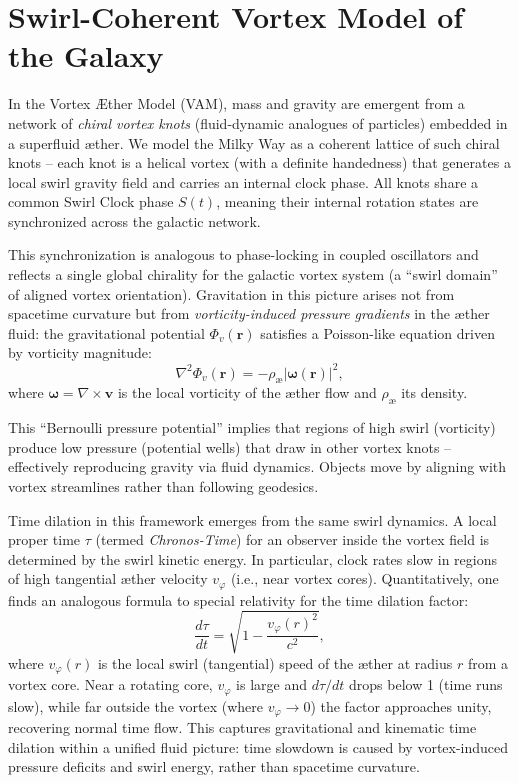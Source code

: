 \section*{Swirl-Coherent Vortex Model of the Galaxy}

In the Vortex \AE ther Model (VAM), mass and gravity are emergent from a network of \emph{chiral vortex knots} (fluid-dynamic analogues of particles) embedded in a superfluid \ae ther. We model the Milky Way as a coherent lattice of such chiral knots -- each knot is a helical vortex (with a definite handedness) that generates a local swirl gravity field and carries an internal clock phase. All knots share a common Swirl Clock phase $S(t)$, meaning their internal rotation states are synchronized across the galactic network\cite{iskandarani2025vam2}.

This synchronization is analogous to phase-locking in coupled oscillators and reflects a single global chirality for the galactic vortex system (a ``swirl domain'' of aligned vortex orientation). Gravitation in this picture arises not from spacetime curvature but from \emph{vorticity-induced pressure gradients} in the \ae ther fluid: the gravitational potential $\Phi_v(\mathbf{r})$ satisfies a Poisson-like equation driven by vorticity magnitude\cite{iskandarani2025vam2}:
\begin{equation}
\nabla^2 \Phi_v(\mathbf{r}) = -\rho_{\text{\ae}} |\boldsymbol{\omega}(\mathbf{r})|^2,
\label{eq:swirl-grav}
\end{equation}
where $\boldsymbol{\omega}=\nabla\times \mathbf{v}$ is the local vorticity of the \ae ther flow and $\rho_{\text{\ae}}$ its density\cite{iskandarani2025vam2}.

This ``Bernoulli pressure potential'' implies that regions of high swirl (vorticity) produce low pressure (potential wells) that draw in other vortex knots -- effectively reproducing gravity via fluid dynamics. Objects move by aligning with vortex streamlines rather than following geodesics\cite{iskandarani2025vam2}.

Time dilation in this framework emerges from the same swirl dynamics. A local proper time $\tau$ (termed \emph{Chronos-Time}) for an observer inside the vortex field is determined by the swirl kinetic energy. In particular, clock rates slow in regions of high tangential \ae ther velocity $v_{\varphi}$ (i.e., near vortex cores). Quantitatively, one finds an analogous formula to special relativity for the time dilation factor:
\begin{equation}
\frac{d\tau}{dt} = \sqrt{1 - \frac{v_{\varphi}(r)^2}{c^2}},
\label{eq:swirl-time}
\end{equation}
where $v_{\varphi}(r)$ is the local swirl (tangential) speed of the \ae ther at radius $r$ from a vortex core. Near a rotating core, $v_{\varphi}$ is large and $d\tau/dt$ drops below 1 (time runs slow), while far outside the vortex (where $v_{\varphi}\to 0$) the factor approaches unity, recovering normal time flow. This captures gravitational and kinematic time dilation within a unified fluid picture: time slowdown is caused by vortex-induced pressure deficits and swirl energy, rather than spacetime curvature\cite{iskandarani2025vam2}.

